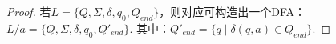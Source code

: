 \begin{proof}
    若$L=\{Q,\Sigma,\delta,q_0,Q_{end}\}$，则对应可构造出一个DFA：$L/a=\{Q,\Sigma,\delta,q_0,Q'_{end}\}$.
    其中：$Q'_{end}=\{ q \mid \delta(q,a)\in Q_{end} \}$.
\end{proof}